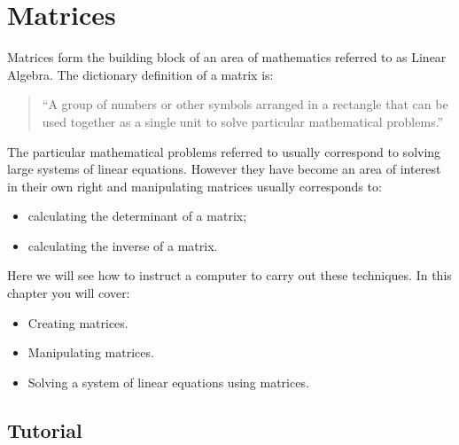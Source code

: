 \chapter{Matrices}
\label{chp:matrices}

Matrices form the building block of an area of mathematics referred to as Linear
Algebra. The dictionary definition of a matrix is:
\begin{quote}
``A group of numbers or other symbols arranged in a rectangle that can be used
together as a single unit to solve particular mathematical problems.''
\end{quote}


The particular mathematical problems referred to usually correspond to solving large
systems of linear equations. However they have become an area of interest in
their own right and manipulating matrices usually corresponds to:
\begin{itemize}
\item 

calculating the determinant of a matrix;

\item 

calculating the inverse of a matrix.

\end{itemize}


Here we will see how to instruct a computer to carry out these techniques.
In this chapter you will cover:

\begin{itemize}
\item 

Creating matrices.

\item 

Manipulating matrices.

\item 

Solving a system of linear equations using matrices.

\end{itemize}





\section{Tutorial}
\label{\detokenize{tools-for-mathematics/04-matrices/tutorial/main:tutorial}}\label{\detokenize{tools-for-mathematics/04-matrices/tutorial/main::doc}}

